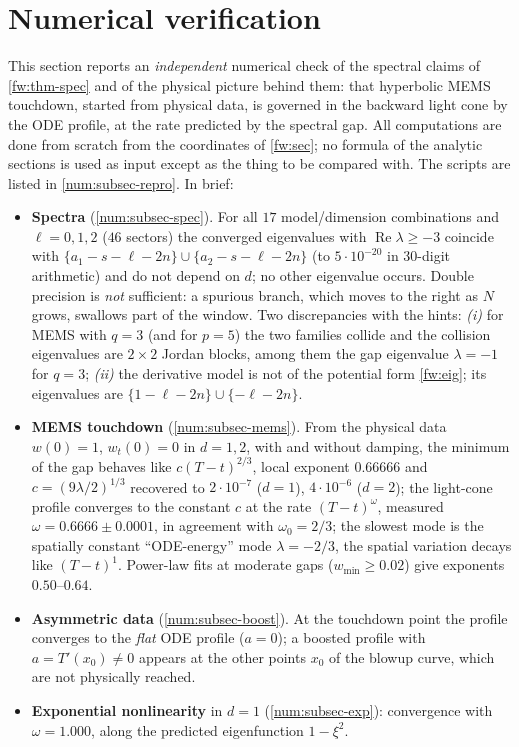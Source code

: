 \section{Numerical verification}
\label{num:sec}

This section reports an \emph{independent} numerical check of the spectral
claims of \cref{fw:thm-spec} and of the physical picture behind them: that
hyperbolic MEMS touchdown, started from physical data, is governed in the
backward light cone by the ODE profile, at the rate predicted by the
spectral gap. All computations are done from scratch from the
coordinates of \cref{fw:sec}; no formula of the analytic sections is used as
input except as the thing to be compared with. The scripts are listed in
\cref{num:subsec-repro}. In brief:
\begin{itemize}[leftmargin=1.4em,itemsep=1pt]
\item \textbf{Spectra} (\cref{num:subsec-spec}). For all $17$ model/dimension
  combinations and $\ell=0,1,2$ ($46$ sectors) the converged eigenvalues with
  $\operatorname{Re}\lambda\ge-3$ coincide with
  $\{a_1-s-\ell-2n\}\cup\{a_2-s-\ell-2n\}$ (to $5\cdot10^{-20}$ in $30$-digit
  arithmetic) and do not depend on $d$; no other eigenvalue occurs. Double
  precision is \emph{not} sufficient: a spurious branch, which moves to the
  right as $N$ grows, swallows part of the window. Two discrepancies with the hints: \emph{(i)} for MEMS with
  $q=3$ (and for $p=5$) the two families collide and the collision
  eigenvalues are $2\times2$ Jordan blocks, among them the gap eigenvalue
  $\lambda=-1$ for $q=3$; \emph{(ii)} the derivative model is not of the
  potential form \eqref{fw:eig}; its eigenvalues are $\{1-\ell-2n\}\cup\{-\ell-2n\}$.
\item \textbf{MEMS touchdown} (\cref{num:subsec-mems}). From the physical
  data $w(0)=1$, $w_t(0)=0$ in $d=1,2$, with and without damping, the minimum
  of the gap behaves like $c(T-t)^{2/3}$, local exponent $0.66666$ and
  $c=(9\lambda/2)^{1/3}$ recovered to $2\cdot10^{-7}$ ($d=1$), $4\cdot10^{-6}$ ($d=2$);
  the light-cone profile converges to the constant $c$ at the rate
  $(T-t)^{\omega}$, measured $\omega=0.6666\pm0.0001$, in agreement with
  $\omega_0=2/3$; the slowest mode is the spatially constant ``ODE-energy''
  mode $\lambda=-2/3$, the spatial variation decays like $(T-t)^{1}$. Power-law
  fits at moderate gaps ($w_{\min}\ge0.02$) give exponents $0.50$--$0.64$.
\item \textbf{Asymmetric data} (\cref{num:subsec-boost}). At the touchdown
  point the profile converges to the \emph{flat} ODE profile ($a=0$); a
  boosted profile with $a=T'(x_0)\ne0$ appears at the other points $x_0$
  of the blowup curve, which are not physically reached.
\item \textbf{Exponential nonlinearity} in $d=1$ (\cref{num:subsec-exp}):
  convergence with $\omega=1.000$, along the predicted eigenfunction $1-\xi^2$.
\end{itemize}

